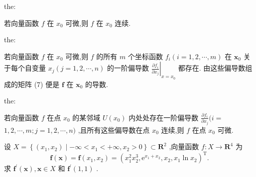\begin{theorem}{}{the:}

\end{theorem}
 若向量函数 \(f\) 在 \({x}_{0}\) 可微,则 \(f\) 在 \({x}_{0}\) 连续.

\begin{theorem}{}{the:}

\end{theorem}
 若向量函数 \(f\) 在 \({x}_{0}\) 可微,则 \(f\) 的所有 \(m\) 个坐标函数 \({f}_{i}\left( {i = 1,2,\cdots ,m}\right)\) 在 \({\mathbf{x}}_{0}\) 关于每个自变量 \({x}_{j}\left( {j = 1,2,\cdots ,n}\right)\) 的一阶偏导数 \({\left. \frac{\partial {f}_{i}}{\partial {x}_{j}}\right| }_{x = {x}_{0}}\) 都存在. 由这些偏导数组成的矩阵 (7) 便是 \(\mathbf{f}\) 在 \({\mathbf{x}}_{0}\) 的导数.

\begin{theorem}{}{the:}

\end{theorem}
 若向量函数 \(f\) 在点 \({x}_{0}\) 的某邻域 \(U\left( {x}_{0}\right)\) 内处处存在一阶偏导数 \(\frac{\partial {f}_{i}}{\partial {x}_{j}}(i =\)  \(1,2,\cdots ,m;j = 1,2,\cdots ,n)\) ,且所有这些偏导数在点 \({x}_{0}\) 连续,则 \(f\) 在点 \({x}_{0}\) 可微.

\begin{example}

\end{example}
设 \(X = \left\{  {\left( {{x}_{1},{x}_{2}}\right)  \mid   - \infty  < {x}_{1} <  + \infty ,{x}_{2} > 0}\right\}   \subset  {\mathbf{R}}^{2}\) ,向量函数 \(f : X \rightarrow  {\mathbf{R}}^{4}\) 为
\[
\mathbf{f}\left( \mathbf{x}\right)  = \mathbf{f}\left( {{x}_{1},{x}_{2}}\right)  = {\left( {x}_{1}^{2}{x}_{2}^{3},{\mathrm{e}}^{{x}_{1} + {x}_{2}},{x}_{2},{x}_{1}\ln {x}_{2}\right) }^{\mathrm{T}}.
\]
求 \({\mathbf{f}}^{\prime }\left( \mathbf{x}\right) ,\mathbf{x} \in  X\) 和 \({\mathbf{f}}^{\prime }\left( {1,1}\right)\) .


